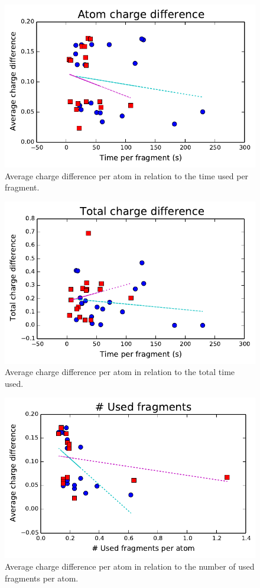 \begin{figure}
\center
\includegraphics[width=.9\textwidth]{img/graphs/3a_00.pdf}
\caption{Average charge difference per atom in relation to the time used per fragment.}
\end{figure}

\begin{figure}
\center
\includegraphics[width=.9\textwidth]{img/graphs/3a_01.pdf}
\caption{Average charge difference per atom in relation to the total time used.}
\end{figure}

\begin{figure}
\center
\includegraphics[width=.9\textwidth]{img/graphs/3a_02.pdf}
\caption{Average charge difference per atom in relation to the number of used fragments per atom.}
\end{figure}

